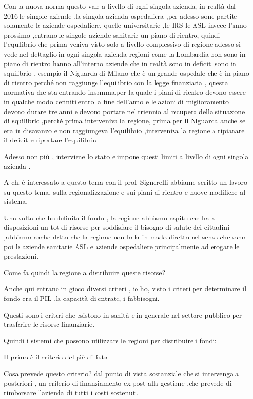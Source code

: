 \documentclass[]{article}
\begin{document}
Con la nuova norma questo vale a livello di ogni singola azienda, in
realtà dal 2016 le singole aziende ,la singola azienda ospedaliera ,per
adesso sono partite solamente le aziende ospedaliere, quelle
universitarie ,le IRS le ASL invece l'anno prossimo ,entrano le singole
aziende sanitarie un piano di rientro, quindi l'equilibrio che prima
veniva visto solo a livello complessivo di regione adesso si vede nel
dettaglio in ogni singola azienda regioni come la Lombardia non sono in
piano di rientro hanno all'interno aziende che in realtà sono in deficit
,sono in squilibrio , esempio il Niguarda di Milano che è un grande
ospedale che è in piano di rientro perché non raggiunge l'equilibrio con
la legge finanziaria , questa normativa che sta entrando insomma,per la
quale i piani di rientro devono essere in qualche modo definiti entro la
fine dell'anno e le azioni di miglioramento devono durare tre anni e
devono portare nel triennio al recupero della situazione di squilibrio
,perché prima interveniva la regione, prima per il Niguarda anche se era
in disavanzo e non raggiungeva l'equilibrio ,interveniva la regione a
ripianare il deficit e riportare l'equilibrio.

Adesso non più , interviene lo stato e impone questi limiti a livello di
ogni singola azienda .

A chi è interessato a questo tema con il prof. Signorelli abbiamo
scritto un lavoro su questo tema, sulla regionalizzazione e sui piani di
rientro e nuove modifiche al sistema.

Una volta che ho definito il fondo , la regione abbiamo capito che ha a
disposizioni un tot di risorse per soddisfare il bisogno di salute dei
cittadini ,abbiamo anche detto che la regione non lo fa in modo diretto
nel senso che sono poi le aziende sanitarie ASL e aziende ospedaliere
principalmente ad erogare le prestazioni.

Come fa quindi la regione a distribuire queste risorse?

Anche qui entrano in gioco diversi criteri , io ho, visto i criteri per
determinare il fondo era il PIL ,la capacità di entrate, i fabbisogni.

Questi sono i criteri che esistono in sanità e in generale nel settore
pubblico per trasferire le risorse finanziarie.

Quindi i sistemi che possono utilizzare le regioni per distribuire i
fondi:

Il primo è il criterio del piè di lista.

Cosa prevede questo criterio? dal punto di vista sostanziale che si
intervenga a posteriori , un criterio di finanziamento ex post alla
gestione ,che prevede di rimborsare l'azienda di tutti i costi
sostenuti.
\end{document}
